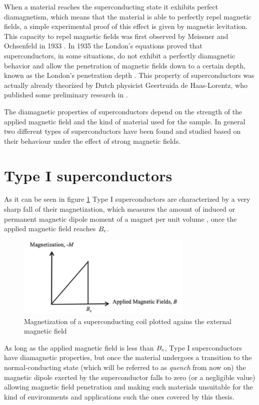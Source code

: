 When a material reaches the superconducting state it exhibits perfect diamagnetism, which means that
the material is able to perfectly repel magnetic fields, a simple experimental proof of this effect
is given by magnetic levitation. This capacity to repel magnetic fields was first observed by
Meissner and Ochsenfeld in 1933 \cite{meissner1933}. In 1935 the London's equations proved that
superconductors, in some situations, do not exhibit a perfectly diamagnetic behavior and allow the
penetration of magnetic fields down to a certain depth, known as the London's penetration depth
\cite{london1935}. This property of superconductors was actually already theorized by Dutch
physicist Geertruida de Haas-Lorentz, who published some preliminary research in
\cite{fokker1925physica}.

The diamagnetic properties of superconductors depend on the strength of the applied magnetic field
and the kind of material used for the sample. In general two different types of superconductors have
been found and studied based on their behaviour under the effect of strong magnetic fields.

\section{Type I superconductors}
\label{sec:type1}
As it can be seen in figure \ref{img:type1-transition} Type I superconductors are characterized by a very
sharp fall of their magnetization, which measures the amount of induced or
permanent magnetic dipole moment of a magnet per unit volume \cite{polarization-magnetization}, once
the applied magnetic field reaches $B_c$.
\begin{figure}
	\centering
	\includegraphics[width=0.75\textwidth]{./img/type1.png}
	\caption{Magnetization of a superconducting coil plotted agains the external magnetic field
		\cite{slimani2022superconducting}}
	\label{img:type1-transition}
\end{figure}
As long as the applied magnetic field is less than $B_c$, Type I superconductors have diamagnetic
properties, but once the material undergoes a transition to the normal-conducting
state (which will be referred to as \emph{quench} from now on) the magnetic dipole exerted by the
superconductor falls to zero (or a negligible value) allowing magnetic field penetration and making such materials unsuitable for the kind of environments and applications such the ones covered by this thesis.

